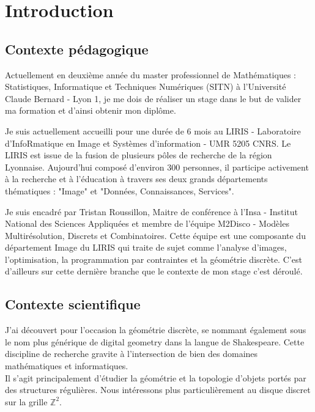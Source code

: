 \section{Introduction}

\subsection{Contexte pédagogique}

Actuellement en deuxième année du master professionnel de Mathématiques : Statistiques, Informatique et Techniques Numériques (SITN) à l’Université Claude Bernard - Lyon 1, je me dois de réaliser un stage dans le but de valider ma formation et d'ainsi obtenir mon diplôme. \newline

Je suis actuellement accueilli pour une durée de 6 mois au LIRIS - Laboratoire d'InfoRmatique en Image et Systèmes d'information - UMR 5205 CNRS. Le LIRIS est issue de la fusion de plusieurs pôles de recherche de la région Lyonnaise. Aujourd'hui composé d'environ 300 personnes, il participe activement à la recherche et à l'éducation à travers ses deux grands départements thématiques : "Image" et "Données, Connaissances, Services".\newline

Je suis encadré par Tristan Roussillon, Maitre de conférence à l'Insa - Institut National des Sciences Appliquées et membre de l'équipe M2Disco - Modèles Multirésolution, Discrets et Combinatoires. Cette équipe est une composante du département Image du LIRIS qui traite de sujet comme l'analyse d'images, l'optimisation, la programmation par contraintes et la géométrie discrète. C'est d'ailleurs sur cette dernière branche que le contexte de mon stage c'est déroulé.



\subsection{Contexte scientifique}

J'ai découvert pour l’occasion la géométrie discrète, se nommant également sous le nom plus générique de digital geometry dans la langue de Shakespeare. Cette discipline de recherche gravite à l'intersection de bien des domaines mathématiques et informatiques.\\


Il s'agit principalement d'étudier la géométrie et la topologie d'objets portés par des structures régulières. Nous intéressons plus particulièrement au disque discret sur la grille $\mathbb{Z}^{2}$. 
